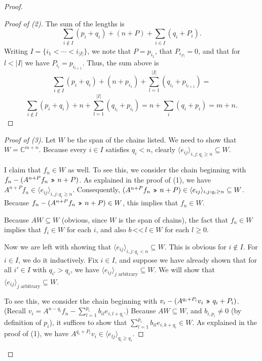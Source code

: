 \documentclass[12pt,psamsfonts]{article}
\newcommand{\leftshift}{\,\texttt{<<}\,}
\newcommand{\rightshift}{\mathbin{\rotatebox[origin=c]{180}{\leftshift}}}
\begin{document}
\begin{proof}
\begin{proof}[Proof of (2)]
        The sum of the lengths is
        \[\sum_{i \notin I} (p_i + q_i) + (n + P) + \sum_{i \in I} (q_i + P_i).\]
        Writing \(I = \{i_1 < \cdots < i_{|I|}\}\), we note that \(P = p_{i_1}\), that \(P_{i_{|I|}} = 0\), and that for \(l < |I|\) we have \(P_{i_l} = p_{i_{l + 1}}\).
        Thus, the sum above is 
        \[\sum_{i \notin I} (p_i + q_i) + (n + p_{i_1}) + \sum_{l = 1}^{|I|} (q_{i_l} + p_{i_{l + 1}}) = \]
        \[\sum_{i \notin I} (p_i + q_i) + n + \sum_{l = 1}^{|I|} (q_{i_l} + p_{i_l}) = n + \sum_i (q_i + p_i) = m + n.\]
    \end{proof}
    \begin{proof}[Proof of (3)]
        Let \(W\) be the span of the chains listed.
        We need to show that \(W = \mathbb{C}^{m + n}\).
        Because every \(i \in I\) satisfies \(q_i < n\), clearly \(\langle e_{ij}\rangle_{i,j : q_i \geq n} \subseteq W\).
        \par I claim that \(f_n \in W\) as well.
        To see this, we consider the chain beginning with \(f_n - (A^{n + P} f_n \rightshift n + P)\).
        As explained in the proof of (1), we have \(A^{n + P} f_n \in \langle e_{ij}\rangle_{i,j : q_i \geq n}\).
        Consequently, \((A^{n + P} f_n \rightshift n + P) \in \langle e_{ij} \rangle_{i,j : q_i \geq n} \subseteq W\).
        Because \(f_n - (A^{n + P} f_n \rightshift n + P) \in W\), this implies that \(f_n \in W\).
        \par Because \(AW \subseteq W\) (obvious, since \(W\) is the span of chains), the fact that \(f_n \in W\) implies that \(f_i \in W\) for each \(i\), and also \(b \leftshift l \in W\) for each \(l \geq 0\).
        \par Now we are left with showing that \(\langle e_{ij} \rangle_{i,j : q_i < n} \subseteq W\).
        This is obvious for \(i \notin I\).
        For \(i \in I\), we do it inductively.
        Fix \(i \in I\), and suppose we have already shown that for all \(i' \in I\) with \(q_{i'} > q_i\), we have \(\langle e_{ij} \rangle_{j \textrm{ arbitrary}} \subseteq W\).
        We will show that \(\langle e_{ij} \rangle_{j \textrm{ arbitrary}} \subseteq W\).
        \par To see this, we consider the chain beginning with \(v_i - (A^{q_i + P_i} v_i \rightshift q_i + P_i)\).
        (Recall \(v_i = A^{n - q_i} f_n - \sum_{l = 1}^{p_i} b_{il} e_{i,l + q_i}\).)
        Because \(AW \subseteq W\), and \(b_{i,p_i} \neq 0\) (by definition of \(p_i\)), it suffices to show that \(\sum_{l = 1}^{p_i} b_{il} e_{i,k + q_i} \in W\).
        As explained in the proof of (1), we have \(A^{q_i + P_i} v_i \in \langle e_{lj} \rangle_{q_l \geq q_i}\).

\end{proof}
\end{proof}
\end{document}
